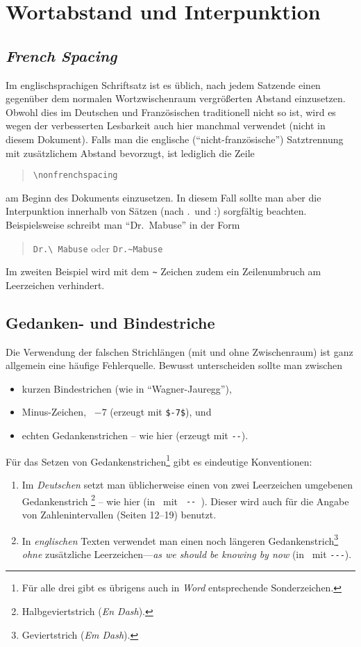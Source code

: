 \section{Wortabstand und Interpunktion}

\subsection{\emph{French Spacing}}
Im englischsprachigen Schriftsatz ist es üblich, nach jedem
Satzende einen gegenüber dem normalen Wortzwischenraum
vergrößerten Abstand einzusetzen. Obwohl dies im Deutschen und
Französischen traditionell nicht so ist, wird es wegen der
verbesserten Lesbarkeit auch hier manchmal verwendet (nicht in diesem
Dokument). Falls man die englische ("`nicht-französische"') Satztrennung mit
zusätzlichem Abstand bevorzugt, ist lediglich die Zeile
%
\begin{quote}
\verb!\nonfrenchspacing!
\end{quote}
%
am Beginn des Dokuments einzusetzen. 
In diesem Fall sollte man 
aber die Interpunktion innerhalb von
Sätzen (nach .\ und :) sorgfältig beachten. Beispielsweise
schreibt man "`Dr.\ Mabuse"' in der Form
%
\begin{quote}
\verb!Dr.\ Mabuse! oder \verb!Dr.~Mabuse!
\end{quote}
%
Im zweiten Beispiel wird mit dem \verb!~! Zeichen zudem ein Zeilenumbruch am Leerzeichen verhindert.


\subsection{Gedanken- und Bindestriche}
\label{sec:gedankenstrich}

Die Verwendung der falschen Strichlängen (mit und ohne
Zwischenraum) ist ganz allgemein eine häufige Fehlerquelle.
Bewusst unterscheiden sollte man zwischen
%
\begin{itemize}
\item kurzen Bindestrichen (wie in "`Wagner-Jauregg"'), %
\item Minus-Zeichen, \zB\ $-7$ (erzeugt mit \verb!$-7$!), und %
\item echten Gedankenstrichen -- wie hier (erzeugt mit \verb!--!).
\end{itemize}
%
\noindent Für das Setzen von Gedankenstrichen\footnote{Für alle
drei gibt es übrigens auch in \emph{Word} entsprechende
Sonderzeichen.} gibt es eindeutige Konventionen:
%
\begin{enumerate}
\item Im \emph{Deutschen} setzt man üblicherweise einen von zwei
Leerzeichen umgebenen Gedankenstrich%
\footnote{Halbgeviertstrich (\emph{En Dash}).} -- wie hier (in
\latex\ mit {\verb*! -- !}). Dieser wird auch für die Angabe von
Zahlenintervallen (Seiten 12--19) benutzt. 
%
\item In \emph{englischen} Texten verwendet man einen noch längeren
Gedankenstrich\footnote{Geviertstrich (\emph{Em Dash}).} \emph{ohne}
zusätzliche Leerzeichen---\emph{as we should be knowing by now}
(in \latex\ mit {\verb*!---!}).
%
\end{enumerate}




